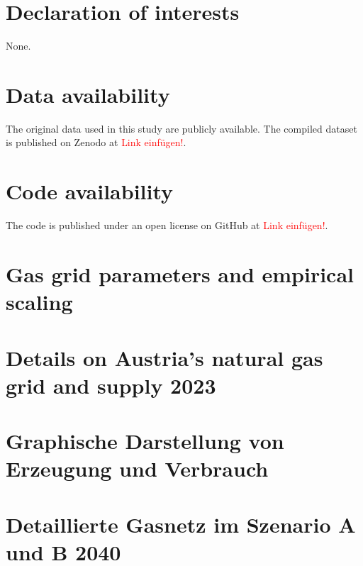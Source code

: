 \documentclass[review]{elsarticle}
\begin{document}
\section*{Declaration of interests}
None.
\section*{Data availability}
The original data used in this study are publicly available. The compiled dataset is published on Zenodo at \textcolor{red}{Link einfügen!}. 
\section*{Code availability}
The code is published under an open license on GitHub at \textcolor{red}{Link einfügen!}. 


\appendix
\setcounter{table}{0}
\setcounter{figure}{0}

\section{Gas grid parameters and empirical scaling}\label{paramter}


\section{Details on Austria's natural gas grid and supply 2023}\label{Natural_gas_supply_in_Austria}


\section{Graphische Darstellung von Erzeugung und Verbrauch}\label{app:visualization}



\section{Detaillierte Gasnetz im Szenario A und B 2040}\label{app_results_2040_extension}
\end{document}

